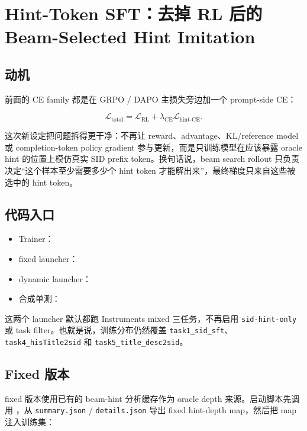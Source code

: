 \section{Hint-Token SFT：去掉 RL 后的 Beam-Selected Hint Imitation}

\subsection{动机}

前面的 CE family 都是在 GRPO / DAPO 主损失旁边加一个 prompt-side CE：

\[
\mathcal{L}_{\text{total}}
= \mathcal{L}_{\text{RL}}
+ \lambda_{\text{CE}} \mathcal{L}_{\text{hint-CE}} .
\]

这次新设定把问题拆得更干净：不再让 reward、advantage、KL/reference model 或 completion-token policy gradient 参与更新，而是只训练模型在应该暴露 oracle hint 的位置上模仿真实 SID prefix token。换句话说，beam search rollout 只负责决定“这个样本至少需要多少个 hint token 才能解出来”，最终梯度只来自这些被选中的 hint token。

\subsection{代码入口}

{\footnotesize
\begin{itemize}
\item Trainer：
\item fixed launcher：
\item dynamic launcher：
\item 合成单测：
\end{itemize}
}

这两个 launcher 默认都跑 Instruments mixed 三任务，不再启用 \texttt{sid-hint-only} 或 task filter。也就是说，训练分布仍然覆盖 \texttt{task1\_sid\_sft}、\texttt{task4\_hisTitle2sid} 和 \texttt{task5\_title\_desc2sid}。

\subsection{Fixed 版本}

fixed 版本使用已有的 beam-hint 分析缓存作为 oracle depth 来源。启动脚本先调用
，从 \texttt{summary.json} / \texttt{details.json} 导出 fixed hint-depth map，然后把 map 注入训练集：

